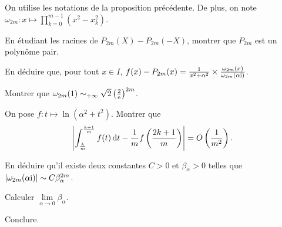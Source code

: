 \begin{exercice}
On utilise les notations de la proposition précédente. De plus, on note $\omega_{2m} : x \mapsto \prod\limits_{k=0}^{m-1} (x^2 - x_k^2)$.
\begin{questions}
\item En étudiant les racines de $P_{2m}(X) - P_{2m}(-X)$, montrer que $P_{2m}$ est un polynôme pair.

\item En déduire que, pour tout $x \in I$, $f(x) - P_{2m}(x) = \frac{1}{x^2 + \alpha^2} \times \frac{\omega_{2m}(x)}{\omega_{2m}(\alpha \mathrm{i})}$.

\item Montrer que $\omega_{2m}(1) \sim_{+\infty} \sqrt{2} \left(\frac{2}{\mathrm{e}}\right)^{2m}$.

\item On pose $f : t \mapsto \ln(\alpha^2 + t^2)$. Montrer que
\[
\left| \int_{\frac{k}{m}}^{\frac{k+1}{m}} f(t) \, \mathrm{d} t - \frac{1}{m} f\left(\frac{2 k + 1}{m}\right) \right| = O\left(\frac{1}{m^2}\right).
\]

\item En déduire qu'il existe deux constantes $C > 0$ et  $\beta_\alpha > 0$ telles que $\left| \omega_{2m}(\alpha \mathrm{i}) \right| \sim C \beta_\alpha^{2m}$.

\item Calculer $\lim\limits_{\alpha\to0} \beta_\alpha$.

\item Conclure.
\end{questions}
\end{exercice}

